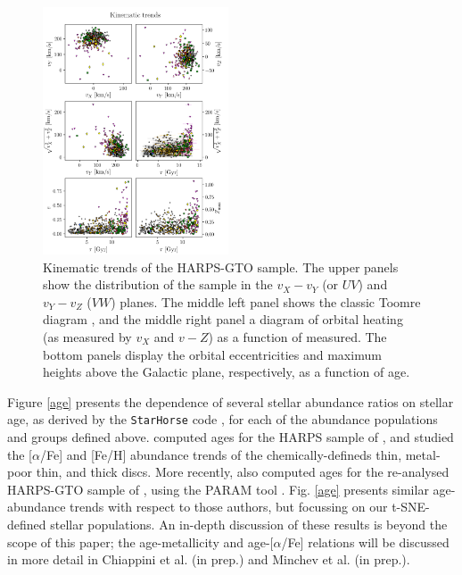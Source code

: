 \documentclass{aa}  %
\begin{document}
\begin{figure}\centering
 \includegraphics[width=0.49\textwidth]{im/harps_tsne-kin-abundsplot_teffcut.png}
\caption{Kinematic trends of the HARPS-GTO sample. The upper panels show the distribution of the sample in the $v_X-v_Y$ (or $UV$) and $v_Y-v_Z$ ($VW$) planes. The middle left panel shows the classic Toomre diagram \citep[e.g.][]{Feltzing2003}, and the middle right panel a diagram of orbital heating (as measured by $v_X$ and $v-Z$) as a function of measured. The bottom panels display the orbital eccentricities and maximum heights above the Galactic plane, respectively, as a function of age.}
\label{kin}
\end{figure}

Figure \ref{age} presents the dependence of several stellar abundance ratios on stellar age, as derived by the {\tt StarHorse} code \citep{Queiroz2018}, for each of the abundance populations and groups defined above. \citet{Haywood2013} computed ages for the HARPS sample of \citet{Adibekyan2012}, and studied the [$\alpha$/Fe] and [Fe/H] abundance trends of the chemically-defineds thin, metal-poor thin, and thick discs. More recently, \citet{DelgadoMena2017} also computed ages for the re-analysed HARPS-GTO sample of \citet{DelgadoMena2018}, using the PARAM tool \citep{daSilva2006}. Fig. \ref{age} presents similar age-abundance trends with respect to those authors, but focussing on our t-SNE-defined stellar populations. An in-depth discussion of these results is beyond the scope of this paper; the age-metallicity and age-[$\alpha$/Fe] relations will be discussed in more detail in Chiappini et al. (in prep.) and Minchev et al. (in prep.).
\end{document}
